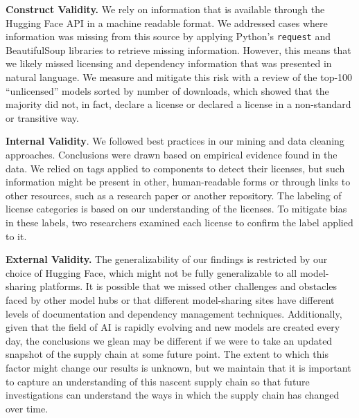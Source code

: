 
\textbf{Construct Validity.} 
We rely on information that is available through the Hugging Face API in a machine readable format. We addressed cases where information was missing from this source by applying Python's \texttt{request} and BeautifulSoup libraries to retrieve missing information. However, this means that we likely missed licensing and dependency information that was presented in natural language.  We measure and mitigate this risk with a review of the top-100 ``unlicensed'' models sorted by number of downloads, which showed that the majority did not, in fact, declare a license or declared a license in a non-standard or transitive way.  %
 
\textbf{Internal Validity}.
We followed best practices in our mining and data cleaning approaches. Conclusions were drawn based on empirical evidence found in the data. We relied on tags applied to components to detect their licenses, but such information might be present in other, human-readable forms or through links to other resources, such as a research paper or another repository. 
The labeling of license categories is based on our understanding of the licenses. To mitigate bias in these labels, two researchers examined each license to confirm the label applied to it. %

\textbf{External Validity.}
The generalizability of our findings is restricted by our choice of Hugging Face, which might not be fully generalizable to all model-sharing platforms. It is possible that we missed other challenges and obstacles faced by other model hubs or that different model-sharing sites have different levels of documentation and dependency management techniques. Additionally, given that the field of AI is rapidly evolving and new models are created every day, the conclusions we glean may be different if we were to take an updated snapshot of the supply chain at some future point. The extent to which this factor might change our results is unknown, but we maintain that it is important to capture an understanding of this nascent supply chain so that future investigations can understand the ways in which the supply chain has changed over time.
